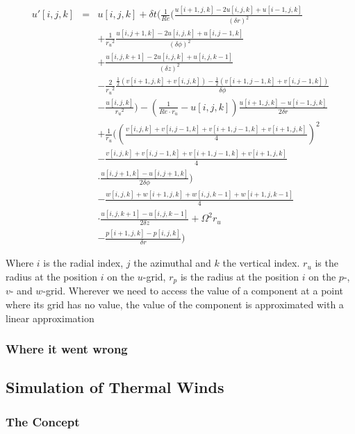\documentclass[12pt, a4paper, twoside]{article}
\begin{document}
			\begin{eqnarray}
				u'[i,j,k] &=& u[i,j,k] + \delta t \Bigg( \frac{1}{Re}\Bigg(\frac{u[i+1,j,k]-2u[i,j,k]+u[i-1,j,k]}{(\delta r)^2}
				\nonumber \\
				&& + \frac{1}{{r_u}^2}\frac{u[i,j+1,k]-2u[i,j,k]+u[i,j-1,k]}{(\delta \phi)^2}
				\nonumber \\
				&& + \frac{u[i,j,k+1] - 2u[i,j,k] +u[i,j,k-1]}{(\delta z)^2}
				\nonumber \\
				&& - \frac{2}{{r_u}^2}\frac{\frac{1}{2}\left(v[i+1,j,k]+v[i,j,k]\right)-\frac{1}{2}\left(v[i+1,j-1,k]+v[i,j-1,k]\right)}{\delta \phi}
				\nonumber \\
				&&- \frac{u[i,j,k]}{{r_u}^2}\Bigg) - \left(\frac{1}{Re\cdot r_u} - u[i,j,k]\right)\frac{u[i+1,j,k]-u[i-1,j,k]}{2\delta r}
				\nonumber \\
				&& + \frac{1}{r_u}\Bigg(\left(\frac{v[i,j,k]+v[i,j-1,k]+v[i+1,j-1,k]+v[i+1,j,k]}{4}\right)^2
				\nonumber \\
				&& - \frac{v[i,j,k]+v[i,j-1,k]+v[i+1,j-1,k]+v[i+1,j,k]}{4}
				\nonumber \\
				&&\cdot \frac{u[i,j+1,k]-u[i,j+1,k]}{2\delta \phi}\Bigg)
				\nonumber \\
				&& - \frac{w[i,j,k]+w[i+1,j,k]+w[i,j,k-1]+w[i+1,j,k-1]}{4}
				\nonumber \\
				&&\cdot \frac{u[i,j,k+1]-u[i,j,k-1]}{2\delta z} + \Omega^2 r_u
				\nonumber \\
				&& - \frac{p[i+1,j,k]-p[i,j,k]}{\delta r} \Bigg)
			\end{eqnarray}
			
			Where $i$ is the radial index, $j$ the azimuthal and $k$ the vertical index. $r_u$ is the radius at the position $i$ on the $u$-grid, $r_p$ is the radius at the position $i$ on the $p$-, $v$- and $w$-grid.
			Wherever we need to access the value of a component at a point where its grid has no value, the value of the component is approximated with a linear approximation
			
		\subsubsection{Where it went wrong}
	
	\subsection{Simulation of Thermal Winds}
		\subsubsection{The Concept}
\end{document}
